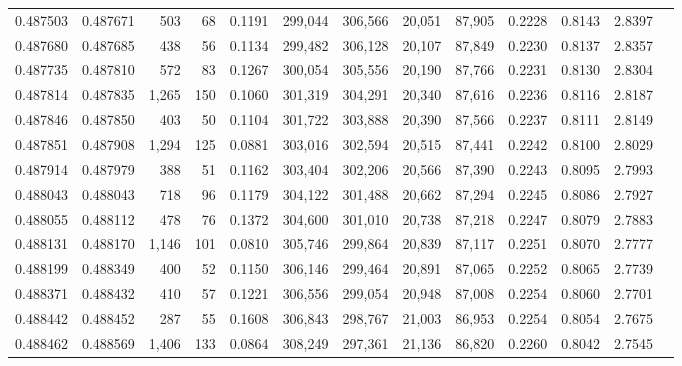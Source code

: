 \begin{tabular}{rrrrrrrrrrrrr}
0.487503 & 0.487671 &   503 &    68 &                                     0.1191 & 299,044 & 306,566 &  20,051 &  87,905 & 0.2228 & 0.8143 & 2.8397 \\
0.487680 & 0.487685 &   438 &    56 &                                     0.1134 & 299,482 & 306,128 &  20,107 &  87,849 & 0.2230 & 0.8137 & 2.8357 \\
0.487735 & 0.487810 &   572 &    83 &                                     0.1267 & 300,054 & 305,556 &  20,190 &  87,766 & 0.2231 & 0.8130 & 2.8304 \\
0.487814 & 0.487835 & 1,265 &   150 &                                     0.1060 & 301,319 & 304,291 &  20,340 &  87,616 & 0.2236 & 0.8116 & 2.8187 \\
0.487846 & 0.487850 &   403 &    50 &                                     0.1104 & 301,722 & 303,888 &  20,390 &  87,566 & 0.2237 & 0.8111 & 2.8149 \\
0.487851 & 0.487908 & 1,294 &   125 &                                     0.0881 & 303,016 & 302,594 &  20,515 &  87,441 & 0.2242 & 0.8100 & 2.8029 \\
0.487914 & 0.487979 &   388 &    51 &                                     0.1162 & 303,404 & 302,206 &  20,566 &  87,390 & 0.2243 & 0.8095 & 2.7993 \\
0.488043 & 0.488043 &   718 &    96 &                                     0.1179 & 304,122 & 301,488 &  20,662 &  87,294 & 0.2245 & 0.8086 & 2.7927 \\
0.488055 & 0.488112 &   478 &    76 &                                     0.1372 & 304,600 & 301,010 &  20,738 &  87,218 & 0.2247 & 0.8079 & 2.7883 \\
0.488131 & 0.488170 & 1,146 &   101 &                                     0.0810 & 305,746 & 299,864 &  20,839 &  87,117 & 0.2251 & 0.8070 & 2.7777 \\
0.488199 & 0.488349 &   400 &    52 &                                     0.1150 & 306,146 & 299,464 &  20,891 &  87,065 & 0.2252 & 0.8065 & 2.7739 \\
0.488371 & 0.488432 &   410 &    57 &                                     0.1221 & 306,556 & 299,054 &  20,948 &  87,008 & 0.2254 & 0.8060 & 2.7701 \\
0.488442 & 0.488452 &   287 &    55 &                                     0.1608 & 306,843 & 298,767 &  21,003 &  86,953 & 0.2254 & 0.8054 & 2.7675 \\
0.488462 & 0.488569 & 1,406 &   133 &                                     0.0864 & 308,249 & 297,361 &  21,136 &  86,820 & 0.2260 & 0.8042 & 2.7545 \\

\end{tabular}
